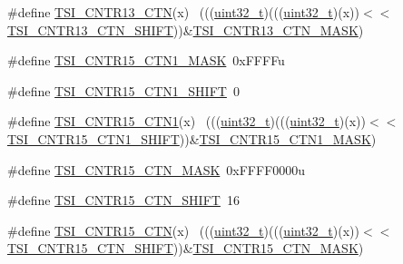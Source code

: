 \begin{DoxyCompactItemize}
\item 
\#define \hyperlink{group___t_s_i___register___masks_ga2501cf6e6a26ae480b270ae90da03716}{T\+S\+I\+\_\+\+C\+N\+T\+R13\+\_\+\+C\+TN}(x)                                            ~(((\hyperlink{_p_e___types_8h_a33594304e786b158f3fb30289278f5af}{uint32\+\_\+t})(((\hyperlink{_p_e___types_8h_a33594304e786b158f3fb30289278f5af}{uint32\+\_\+t})(x))$<$$<$\hyperlink{group___t_s_i___register___masks_gaffd92baf7411ffdc73289bcf96764e3a}{T\+S\+I\+\_\+\+C\+N\+T\+R13\+\_\+\+C\+T\+N\+\_\+\+S\+H\+I\+FT}))\&\hyperlink{group___t_s_i___register___masks_gac4b6ed4489dd39029223b49be774965a}{T\+S\+I\+\_\+\+C\+N\+T\+R13\+\_\+\+C\+T\+N\+\_\+\+M\+A\+SK})
\item 
\#define \hyperlink{group___t_s_i___register___masks_gaa249fbc86511094b5b4ea1cfdff064d1}{T\+S\+I\+\_\+\+C\+N\+T\+R15\+\_\+\+C\+T\+N1\+\_\+\+M\+A\+SK}~0x\+F\+F\+F\+Fu
\item 
\#define \hyperlink{group___t_s_i___register___masks_ga7938e4586802c6fa57e4d0145b36aa70}{T\+S\+I\+\_\+\+C\+N\+T\+R15\+\_\+\+C\+T\+N1\+\_\+\+S\+H\+I\+FT}~0
\item 
\#define \hyperlink{group___t_s_i___register___masks_ga9ec01214a1e4b6c4f0d7fe19718a32e1}{T\+S\+I\+\_\+\+C\+N\+T\+R15\+\_\+\+C\+T\+N1}(x)                                          ~(((\hyperlink{_p_e___types_8h_a33594304e786b158f3fb30289278f5af}{uint32\+\_\+t})(((\hyperlink{_p_e___types_8h_a33594304e786b158f3fb30289278f5af}{uint32\+\_\+t})(x))$<$$<$\hyperlink{group___t_s_i___register___masks_ga7938e4586802c6fa57e4d0145b36aa70}{T\+S\+I\+\_\+\+C\+N\+T\+R15\+\_\+\+C\+T\+N1\+\_\+\+S\+H\+I\+FT}))\&\hyperlink{group___t_s_i___register___masks_gaa249fbc86511094b5b4ea1cfdff064d1}{T\+S\+I\+\_\+\+C\+N\+T\+R15\+\_\+\+C\+T\+N1\+\_\+\+M\+A\+SK})
\item 
\#define \hyperlink{group___t_s_i___register___masks_ga35c1646ad39bdaa79f196bf3feb17c57}{T\+S\+I\+\_\+\+C\+N\+T\+R15\+\_\+\+C\+T\+N\+\_\+\+M\+A\+SK}~0x\+F\+F\+F\+F0000u
\item 
\#define \hyperlink{group___t_s_i___register___masks_ga78cfe2a84b08fb470251a3f7b5ff4596}{T\+S\+I\+\_\+\+C\+N\+T\+R15\+\_\+\+C\+T\+N\+\_\+\+S\+H\+I\+FT}~16
\item 
\#define \hyperlink{group___t_s_i___register___masks_gabdb8510f1ed62f131dccfc0a027a6ef8}{T\+S\+I\+\_\+\+C\+N\+T\+R15\+\_\+\+C\+TN}(x)                                            ~(((\hyperlink{_p_e___types_8h_a33594304e786b158f3fb30289278f5af}{uint32\+\_\+t})(((\hyperlink{_p_e___types_8h_a33594304e786b158f3fb30289278f5af}{uint32\+\_\+t})(x))$<$$<$\hyperlink{group___t_s_i___register___masks_ga78cfe2a84b08fb470251a3f7b5ff4596}{T\+S\+I\+\_\+\+C\+N\+T\+R15\+\_\+\+C\+T\+N\+\_\+\+S\+H\+I\+FT}))\&\hyperlink{group___t_s_i___register___masks_ga35c1646ad39bdaa79f196bf3feb17c57}{T\+S\+I\+\_\+\+C\+N\+T\+R15\+\_\+\+C\+T\+N\+\_\+\+M\+A\+SK})
$$
\end{DoxyCompactItemize}
